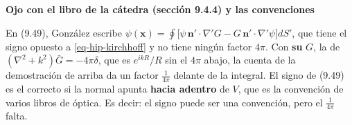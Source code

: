 \documentclass[
  spanish,
  a4paper,
]{scrbook}
\theoremstyle{definition}
\theoremstyle{plain}
\theoremstyle{definition}
\theoremstyle{plain}
\theoremstyle{definition}
\theoremstyle{remark}
\begin{document}
\begin{tcolorbox}[enhanced jigsaw, arc=.35mm, bottomrule=.15mm, breakable, colback=white, colframe=quarto-callout-warning-color-frame, left=2mm, leftrule=.75mm, opacityback=0, rightrule=.15mm, toprule=.15mm]
\begin{minipage}[t]{5.5mm}
\textcolor{quarto-callout-warning-color}{\faExclamationTriangle}
\end{minipage}%
\begin{minipage}[t]{\textwidth - 5.5mm}

\vspace{-3mm}\textbf{Ojo con el libro de la cátedra (sección 9.4.4) y las convenciones}\vspace{3mm}

En (9.49), González escribe
\(\psi(\mathbf x) = \oint\big[\psi\,\mathbf n'\cdot\nabla'G - G\,\mathbf n'\cdot\nabla'\psi\big]dS'\),
que tiene el signo opuesto a \ref{eq-hip-kirchhoff} y no tiene ningún
factor \(4\pi\). Con \textbf{su} \(G\), la de
\((\nabla^2+k^2)\bar G = -4\pi\delta\), que es \(e^{ikR}/R\) sin el
\(4\pi\) abajo, la cuenta de la demostración de arriba da un factor
\(\tfrac{1}{4\pi}\) delante de la integral. El signo de (9.49) es el
correcto si la normal apunta \textbf{hacia adentro} de \(V\), que es la
convención de varios libros de óptica. Es decir: el signo puede ser una
convención, pero el \(\tfrac{1}{4\pi}\) falta.

\end{minipage}%
\end{tcolorbox}
\end{document}
